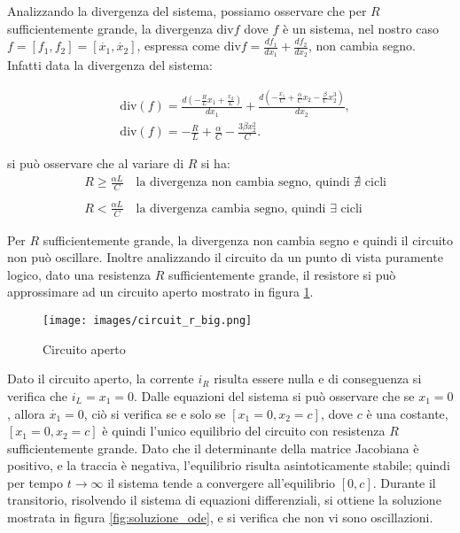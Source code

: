 \documentclass{article}
\begin{document}
Analizzando la divergenza del sistema, possiamo osservare che per \(R\) sufficientemente grande, la divergenza div\(f\) dove \(f\) è un sistema, nel nostro caso \(f = [f_1, f_2] = [\dot{x_1}, \dot{x_2}]\), espressa come div\(f = \frac{df_1}{dx_1} + \frac{df_2}{dx_2}\), non cambia segno. Infatti data la divergenza del sistema:

\begin{align*}
     & \text{div}(f) = \frac{d(-\frac{R}{L}x_1 + \frac{x_2}{L})}{dx_1} + \frac{d(-\frac{x_1}{C} + \frac{\alpha}{C}x_2 - \frac{\beta}{C}x_2^3)}{dx_2}, \\
     & \text{div}(f) = -\frac{R}{L} + \frac{\alpha}{C} - \frac{3\beta x_2^2}{C}.
\end{align*}

si può osservare che al variare di \(R\) si ha:
\begin{align*}
     & R \geq \frac{\alpha L}{C} \hspace{1em} \text{la divergenza non cambia segno, quindi } \nexists \text{ cicli} \\\\
     & R < \frac{\alpha L}{C} \hspace{1em} \text{la divergenza cambia segno, quindi } \exists \text{ cicli}
\end{align*}

Per \(R\) sufficientemente grande, la divergenza non cambia segno e quindi il circuito non può oscillare.
Inoltre analizzando il circuito da un punto di vista puramente logico, dato una resistenza \(R\) sufficientemente grande, il resistore si può approssimare ad un circuito aperto mostrato in figura \ref{fig:circuito_aperto}.

\begin{figure}[ht]
    \texttt{[image: images/circuit\_r\_big.png]}
    \caption{Circuito aperto}
    \label{fig:circuito_aperto}
\end{figure}

Dato il circuito aperto, la corrente \(i_R\) risulta essere nulla e di conseguenza si verifica che \(i_L = x_1 = 0\). Dalle equazioni del sistema si può osservare che se \(x_1 = 0\), allora \(\dot{x_1} = 0\), ciò si verifica se e solo se \([x_1 = 0, x_2 = c]\), dove \(c\) è una costante, \([x_1 = 0, x_2 = c]\) è quindi l'unico equilibrio del circuito con resistenza \(R\) sufficientemente grande. Dato che il determinante della matrice Jacobiana è positivo, e la traccia è negativa, l'equilibrio risulta asintoticamente stabile; quindi per tempo \(t \to \infty\) il sistema tende a convergere all'equilibrio \([0, c]\). Durante il transitorio, risolvendo il sistema di equazioni differenziali, si ottiene la soluzione mostrata in figura \ref{fig:soluzione_ode}, e si verifica che non vi sono oscillazioni.
\end{document}

